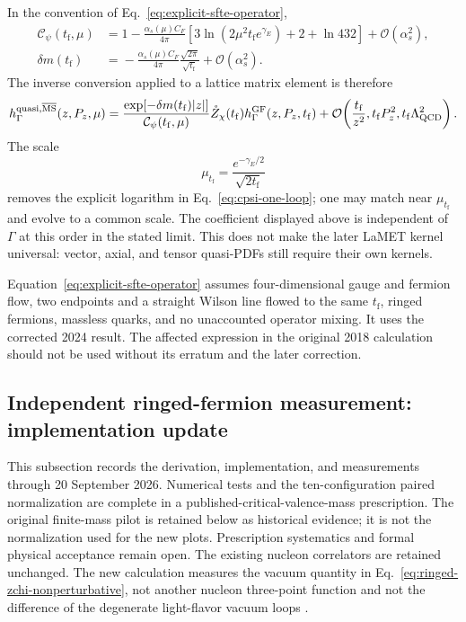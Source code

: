 \documentclass[11pt]{article}
\numberwithin{equation}{section}
\newcommand{\MSbar}{\overline{\mathrm{MS}}}
\newcommand{\cO}{\mathcal{O}}
\newcommand{\tf}{t_{\mathrm f}}
\begin{document}
In the convention of Eq.~\eqref{eq:explicit-sfte-operator},
\begin{align}
  \mathcal C_\psi(\tf,\mu)
  &={}
  1-\frac{\alpha_s(\mu)C_F}{4\pi}
  \left[
    3\ln\!\left(2\mu^2\tf e^{\gamma_E}\right)
    +2+\ln 432
  \right]
  +\cO(\alpha_s^2),
  \label{eq:cpsi-one-loop}
  \\
  \delta m(\tf)
  &={}
  -\frac{\alpha_s(\mu)C_F}{4\pi}
  \frac{\sqrt{2\pi}}{\sqrt{\tf}}
  +\cO(\alpha_s^2).
  \label{eq:delta-m-one-loop}
\end{align}
The inverse conversion applied to a lattice matrix element is therefore
\begin{equation}
  h_\Gamma^{\mathrm{quasi},\MSbar}(z,P_z,\mu)
  =
  \frac{\exp[-\delta m(\tf)|z|]}
       {\mathcal C_\psi(\tf,\mu)}
  \mathring Z_\chi(\tf)
  h_\Gamma^{\mathrm{GF}}(z,P_z,\tf)
  +\cO\!\left(
    \frac{\tf}{z^2},\tf P_z^2,
    \tf\Lambda_{\rm QCD}^2
  \right).
  \label{eq:explicit-sfte-matrix-element}
\end{equation}
The scale
\begin{equation}
  \mu_{\tf}
  =\frac{e^{-\gamma_E/2}}{\sqrt{2\tf}}
  \label{eq:sfte-natural-scale}
\end{equation}
removes the explicit logarithm in Eq.~\eqref{eq:cpsi-one-loop}; one may match
near \(\mu_{\tf}\) and evolve to a common scale.  The coefficient displayed
above is independent of \(\Gamma\) at this order in the stated limit.  This
does not make the later LaMET kernel universal: vector, axial, and tensor
quasi-PDFs still require their own kernels.

Equation~\eqref{eq:explicit-sfte-operator} assumes four-dimensional gauge and
fermion flow, two endpoints and a straight Wilson line flowed to the same
\(\tf\), ringed fermions, massless quarks, and no unaccounted operator mixing.
It uses the corrected 2024 result.  The affected expression in the original
2018 calculation \cite{Monahan2018} should not be used without its erratum and
the later correction.

\subsection{Independent ringed-fermion measurement: implementation update}
\label{sec:ringed-kinetic-implementation}

This subsection records the derivation, implementation, and measurements
through 20 September 2026. Numerical tests and the ten-configuration paired
normalization are complete in a published-critical-valence-mass prescription.
The original finite-mass pilot is retained below as historical evidence;
it is not the normalization used for the new plots. Prescription systematics
and formal physical acceptance remain open. The existing nucleon
correlators are retained unchanged.  The new calculation measures the vacuum
quantity in Eq.~\eqref{eq:ringed-zchi-nonperturbative}, not another nucleon
three-point function and not the difference of the degenerate light-flavor
vacuum loops \cite{MakinoSuzuki2014,Luscher2013}.
\end{document}
